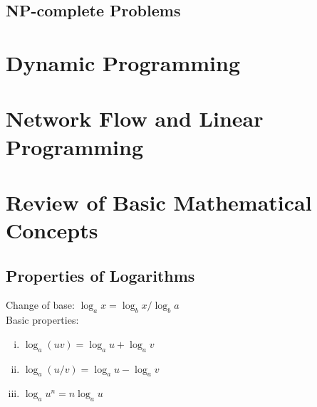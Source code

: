 \documentclass{article}
\begin{document}
		\subsection{NP-complete Problems}
		\clearpage

	\section{Dynamic Programming}
		\clearpage

	\section{Network Flow and Linear Programming}
		\clearpage


	\appendix

	\section{Review of Basic Mathematical Concepts}
		\subsection{Properties of Logarithms}
			Change of base: $\log_a x = \log_b x/\log_b a$ \\
			Basic properties:
			\begin{enumerate}[(i)]
				\item $\log_a(uv) = \log_a u + \log_a v$
				\item $\log_a(u / v) = \log_a u - \log_a v$
				\item $\log_a u^n = n \log_a u$
				\end{enumerate}



	
\end{document}
